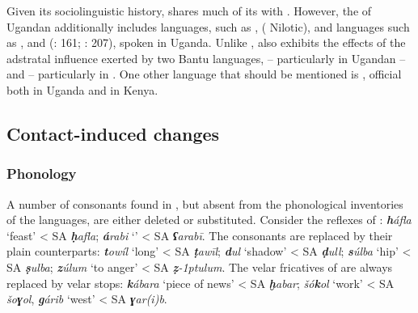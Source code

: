 \documentclass[output=paper]{langsci/langscibook}
\begin{document}
Given its sociolinguistic history,  shares much of its  with  . However, the  of Ugandan  additionally includes   languages, such as ,  ( Nilotic), and   languages such as ,  and  (\citealt{Owens1997}: 161; \citealt{Wellens2003}: 207), spoken in Uganda. Unlike  ,  also exhibits the effects of the adstratal influence exerted by two Bantu languages,  – particularly in Ugandan  – and  – particularly in . One other language that should be mentioned is , official both in Uganda and in Kenya.


 
 \subsection{Contact-induced changes}
 \subsubsection{Phonology}

A number of consonants found in , but absent from the phonological inventories of the  languages, are either deleted or substituted. Consider the reflexes of : \textit{\textbf{h}áfla} ‘feast’ < SA \textit{\textbf{ḥ}afla}; \textit{\textbf{á}rabi} ‘’ < SA \textit{\textbf{ʕ}arabī}. The  consonants are replaced by their plain counterparts: \textit{\textbf{t}owíl} ‘long’ < SA \textit{\textbf{ṭ}awīl}; \textit{\textbf{d}ul} ‘shadow’ < SA \textit{\textbf{ḍ}ull}; \textit{\textbf{s}úlba} ‘hip’ < SA \textit{\textbf{ṣ}ulba}; \textit{\textbf{z}úlum} ‘to anger’ < SA \textit{\textbf{ẓ}\kern -1ptulum}. The velar fricatives of  are always replaced by velar stops: \textit{\textbf{k}ábara} ‘piece of news’ < SA \textit{\textbf{ḫ}abar}; \textit{šó\textbf{k}ol} ‘work’ < SA \textit{šo\textbf{ɣ}ol}, \textit{\textbf{g}árib} ‘west’ < SA \textit{\textbf{ɣ}ar(i)b}. 
\end{document}
